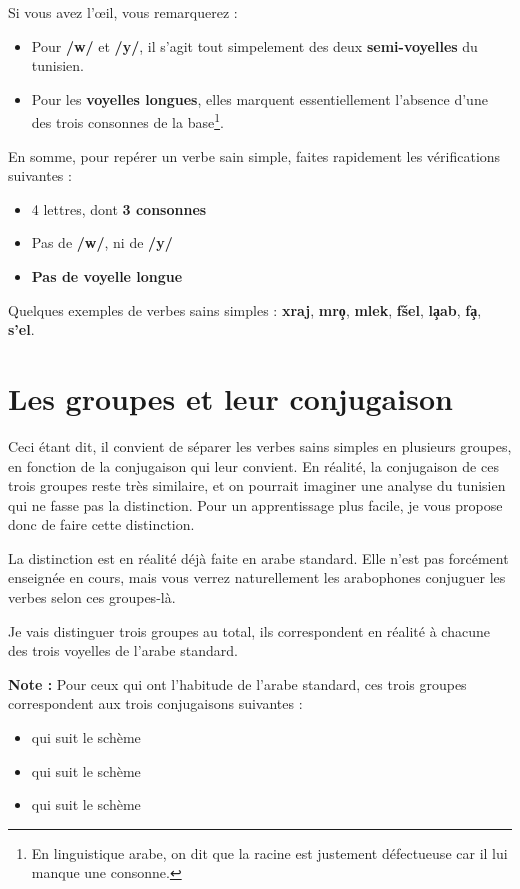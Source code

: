 Si vous avez l'\oe il, vous remarquerez : 

\begin{itemize}
    \item Pour \textbf{/w/} et \textbf{/y/}, il s'agit tout simpelement des deux \textbf{semi-voyelles} du tunisien.
    \item Pour les \textbf{voyelles longues}, elles marquent essentiellement l'absence d'une des trois consonnes de la base\footnote{En linguistique arabe, on dit que la racine est justement défectueuse car il lui manque une consonne.}.
\end{itemize}

En somme, pour repérer un verbe sain simple, faites rapidement les vérifications suivantes :
\begin{itemize}
    \item 4 lettres, dont \textbf{3 consonnes}
    \item Pas de \textbf{/w/},  ni de \textbf{/y/}
    \item \textbf{Pas de voyelle longue}

\end{itemize}

Quelques exemples de verbes sains simples : \textbf{xraj}, \textbf{mro\c{\dh}}, \textbf{mlek}, \textbf{f\v{s}el}, \textbf{l\c{a}ab}, \textbf{\textcrh fa\c{\dh}}, \textbf{s'el}.


\section{Les groupes et leur conjugaison}\label{GroupesVerbesSimples}
Ceci étant dit, il convient de séparer les verbes sains simples en plusieurs groupes, en fonction de la conjugaison qui leur convient. En réalité, la conjugaison de ces trois groupes reste très similaire, et on pourrait imaginer une analyse du tunisien qui ne fasse pas la distinction. Pour un apprentissage plus facile, je vous propose donc de faire cette distinction.

La distinction est en réalité déjà faite en arabe standard. Elle n'est pas forcément enseignée en cours, mais vous verrez naturellement les arabophones conjuguer les verbes selon ces groupes-là.

Je vais distinguer trois groupes au total, ils correspondent en réalité à chacune des trois voyelles de l'arabe standard. 

\textbf{Note :} Pour ceux qui ont l'habitude de l'arabe standard, ces trois groupes correspondent aux trois conjugaisons suivantes : 
\begin{itemize}
    \item {} qui suit le schème 
    \item {} qui suit le schème 
    \item {} qui suit le schème 
\end{itemize}

